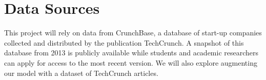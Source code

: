 \section{Data Sources}

This project will rely on data from CrunchBase, a database of start-up companies collected and distributed by the publication TechCrunch. A snapshot of this database from 2013 is publicly available while students and academic researchers can apply for access to the most recent version. We will also explore augmenting our model with a dataset of TechCrunch articles.
